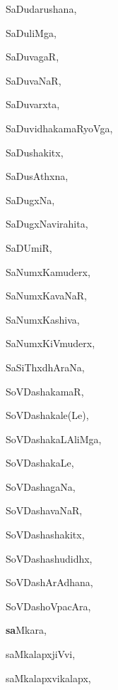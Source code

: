 \begin{multicols}{3}
{\noindent
{SaDudarushana}, \pageref{SaDudarushana}

\noindent
{SaDuliMga}, \pageref{SaDuliMga}

\noindent
{SaDuvagaR}, \pageref{SaDuvagaR}

\noindent
{SaDuvaNaR}, \pageref{SaDuvaNaR}

\noindent
{SaDuvarxta}, \pageref{SaDuvarxta}

\noindent
{SaDuvidhakamaRyoVga}, \pageref{SaDuvidhakamaRyoVga}

\noindent
{SaDushakitx}, \pageref{SaDushakitx}

\noindent
{SaDusAthxna}, \pageref{SaDusAthxna}

\noindent
{SaDugxNa}, \pageref{SaDugxNa}

\noindent
{SaDugxNavirahita}, \pageref{SaDugxNavirahita}

\noindent
{SaDUmiR}, \pageref{SaDUmiR}

\noindent
{SaNumxKamuderx}, \pageref{SaNumxKamuderx}

\noindent
{SaNumxKavaNaR}, \pageref{SaNumxKavaNaR}

\noindent
{SaNumxKashiva}, \pageref{SaNumxKashiva}

\noindent
{SaNumxKiVmuderx}, \pageref{SaNumxKiVmuderx}

\noindent
{SaSiThxdhAraNa}, \pageref{SaSiThxdhAraNa}

\noindent
{SoVDashakamaR}, \pageref{SoVDashakamaR}

\noindent
{SoVDashakale(Le)}, \pageref{SoVDashakaleLe}

\noindent
{SoVDashakaLAliMga}, \pageref{SoVDashakaLAliMga}

\noindent
{SoVDashakaLe}, \pageref{SoVDashakaLe}

\noindent
{SoVDashagaNa}, \pageref{SoVDashagaNa}

\noindent
{SoVDashavaNaR}, \pageref{SoVDashavaNaR}

\noindent
{SoVDashashakitx}, \pageref{SoVDashashakitx}

\noindent
{SoVDashashudidhx}, \pageref{SoVDashashudidhx}

\noindent
{SoVDashArAdhana}, \pageref{SoVDashArAdhana}

\noindent
{SoVDashoVpacAra}, \pageref{SoVDashoVpacAra}

\noindent
{{\large\textbf{sa}}Mkara}, \pageref{saMkara}

\noindent
{saMkalapxjiVvi}, \pageref{saMkalapxjiVvi}

\noindent
{saMkalapxvikalapx}, \pageref{saMkalapxvikalapx}

}
\end{multicols}
